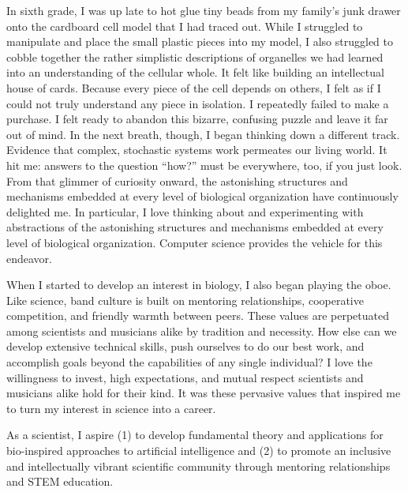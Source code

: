 In sixth grade, I was up late to hot glue tiny beads from my family's junk drawer onto the cardboard cell model that I had traced out.
While I struggled to manipulate and place the small plastic pieces into my model, I also struggled to cobble together the rather simplistic descriptions of organelles we had learned into an understanding of the cellular whole.
It felt like building an intellectual house of cards.
Because every piece of the cell depends on others, I felt as if I could not truly understand any piece in isolation.
I repeatedly failed to make a purchase.
I felt ready to abandon this bizarre, confusing puzzle and leave it far out of mind.
In the next breath, though, I began thinking down a different track.
Evidence that complex, stochastic systems work permeates our living world.
It hit me: answers to the question ``how?'' must be everywhere, too, if you just look.
From that glimmer of curiosity onward, the astonishing structures and mechanisms embedded at every level of biological organization have continuously delighted me.
In particular, I love thinking about and experimenting with abstractions of the astonishing structures and mechanisms embedded at every level of biological organization.
Computer science provides the vehicle for this endeavor.

When I started to develop an interest in biology, I also began playing the oboe.
Like science, band culture is built on mentoring relationships, cooperative competition, and friendly warmth between peers.
These values are perpetuated among scientists and musicians alike by tradition and necessity.
How else can we develop extensive technical skills, push ourselves to do our best work, and accomplish goals beyond the capabilities of any single individual?
I love the willingness to invest, high expectations, and mutual respect scientists and musicians alike hold for their kind.
It was these pervasive values that inspired me to turn my interest in science into a career.

As a scientist, I aspire
(1) to develop fundamental theory and applications for bio-inspired approaches to artificial intelligence and
(2) to promote an inclusive and intellectually vibrant scientific community through mentoring relationships and STEM education.
